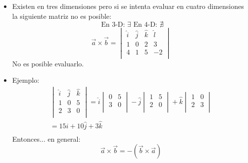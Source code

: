 \documentclass{article}
\begin{document}
\begin{itemize}
    \item Existen en tres dimensiones pero si se intenta evaluar en cuatro dimensiones la siguiente matriz no es posible:
    \[
        \text{  En 3-D: } \exists \text{  En 4-D:  } \nexists 
    \]
        \[
           \vec{a}\times \vec{b} = \begin{vmatrix}
              \hat{i} & \hat{j} & \hat{k} & \hat{l} \\ 
              1 & 0 & 2 & 3 \\ 
              4 & 1 & 5 & -2 \\ 
          \end{vmatrix}
        \]
        No es posible evaluarlo.
    
    \item Ejemplo:
          \begin{align*}
            \begin{vmatrix}
                \hat{i} & \hat{j} & \hat{k} \\ 
                1 & 0 & 5 \\ 
                2 & 3 & 0 \\ 
            \end{vmatrix} = \hat{i}\begin{vmatrix}
                0 & 5 \\ 
                3 & 0 \\ 
            \end{vmatrix} - \hat{j}\begin{vmatrix}
                1 & 5 \\ 
                2 & 0 \\ 
            \end{vmatrix} + \hat{k}\begin{vmatrix}
                1 & 0 \\ 
                2 & 3 \\ 
            \end{vmatrix} \\ 
            = 15\hat{i}+10\hat{j}+3\hat{k}\\ 
          \end{align*}
          Entonces... en general: 
          \[
                \vec{a}\times \vec{b} = -(\vec{b}\times \vec{a})
          \]
\end{itemize}
\end{document}
